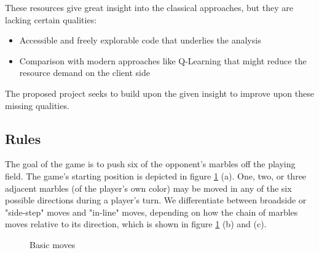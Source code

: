 \documentclass{llncs}
\begin{document}
These resources give great insight into the classical approaches, but they are lacking certain qualities:
\begin{itemize}
  \item Accessible and freely explorable code that underlies the analysis
  \item Comparison with modern approaches like Q-Learning that might reduce the resource demand on the client side
\end{itemize}

The proposed project seeks to build upon the given insight to improve upon these missing qualities.

\subsection{Rules}
The goal of the game is to push six of the opponent's marbles off the playing field. The game's starting position is depicted in figure \ref{basics} (a). One, two, or three adjacent marbles (of the player's own color) may be moved in any of the six possible directions during a player's turn. We differentiate between broadside or "side-step" moves and "in-line" moves, depending on how the chain of marbles moves relative to its direction, which is shown in figure \ref{basics} (b) and (c).

\begin{figure}[!h]
  \centering
  \hfill
  \hfill
  \caption{Basic moves \cite{abalone_sa_abalone_nodate}}
  \label{basics}
\end{figure}
\end{document}
